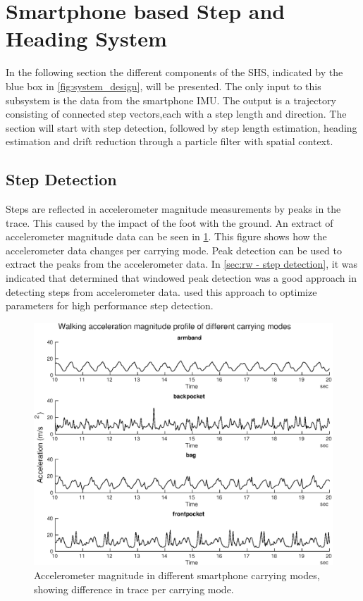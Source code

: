 \section{Smartphone based Step and Heading System}

In the following section the different components of the \ac{SHS}, indicated by the blue box in \cref{fig:system_design}, will be presented. The only input to this subsystem is the data from the smartphone IMU. The output is a trajectory consisting of connected step vectors,each with a step length and direction. The section will start with step detection, followed by step length estimation, heading estimation and drift reduction through a particle filter with spatial context.

\subsection{Step Detection}
\label{sec:meth - step detection}

Steps are reflected in accelerometer magnitude measurements by peaks in the trace. This caused by the impact of the foot with the ground. An extract of accelerometer magnitude data can be seen in \cref{fig:accelerometer_in_different_carrying_modes}. This figure shows how the accelerometer data changes per carrying mode. Peak detection can be used to extract the peaks from the accelerometer data. In \cref{sec:rw - step detection}, it was indicated that \citet{Brajdic2013} determined that windowed peak detection was a good approach in detecting steps from accelerometer data. \citet{Salvi2018} used this approach to optimize parameters for high performance step detection.

\begin{figure}[h]
	\centering
	\includegraphics[width=0.8\linewidth]{images/20201127_1110__frontpocket_}
	\caption{Accelerometer magnitude in different smartphone carrying modes, showing difference in trace per carrying mode.}
	\label{fig:accelerometer_in_different_carrying_modes}
\end{figure}
 

